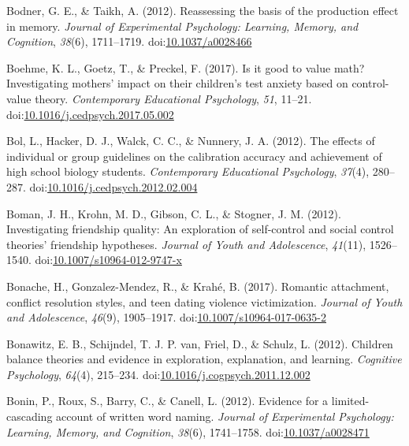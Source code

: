 \documentclass[english,man]{apa6}
\begin{document}
\hypertarget{ref-Bodner2012}{}
Bodner, G. E., \& Taikh, A. (2012). Reassessing the basis of the
production effect in memory. \emph{Journal of Experimental Psychology:
Learning, Memory, and Cognition}, \emph{38}(6), 1711--1719.
doi:\href{https://doi.org/10.1037/a0028466}{10.1037/a0028466}

\hypertarget{ref-Boehme2017}{}
Boehme, K. L., Goetz, T., \& Preckel, F. (2017). Is it good to value
math? Investigating mothers' impact on their children's test anxiety
based on control-value theory. \emph{Contemporary Educational
Psychology}, \emph{51}, 11--21.
doi:\href{https://doi.org/10.1016/j.cedpsych.2017.05.002}{10.1016/j.cedpsych.2017.05.002}

\hypertarget{ref-Bol2012}{}
Bol, L., Hacker, D. J., Walck, C. C., \& Nunnery, J. A. (2012). The
effects of individual or group guidelines on the calibration accuracy
and achievement of high school biology students. \emph{Contemporary
Educational Psychology}, \emph{37}(4), 280--287.
doi:\href{https://doi.org/10.1016/j.cedpsych.2012.02.004}{10.1016/j.cedpsych.2012.02.004}

\hypertarget{ref-BomanIV2012}{}
Boman, J. H., Krohn, M. D., Gibson, C. L., \& Stogner, J. M. (2012).
Investigating friendship quality: An exploration of self-control and
social control theories' friendship hypotheses. \emph{Journal of Youth
and Adolescence}, \emph{41}(11), 1526--1540.
doi:\href{https://doi.org/10.1007/s10964-012-9747-x}{10.1007/s10964-012-9747-x}

\hypertarget{ref-Bonache2017}{}
Bonache, H., Gonzalez-Mendez, R., \& Krahé, B. (2017). Romantic
attachment, conflict resolution styles, and teen dating violence
victimization. \emph{Journal of Youth and Adolescence}, \emph{46}(9),
1905--1917.
doi:\href{https://doi.org/10.1007/s10964-017-0635-2}{10.1007/s10964-017-0635-2}

\hypertarget{ref-Bonawitz2012}{}
Bonawitz, E. B., Schijndel, T. J. P. van, Friel, D., \& Schulz, L.
(2012). Children balance theories and evidence in exploration,
explanation, and learning. \emph{Cognitive Psychology}, \emph{64}(4),
215--234.
doi:\href{https://doi.org/10.1016/j.cogpsych.2011.12.002}{10.1016/j.cogpsych.2011.12.002}

\hypertarget{ref-Bonin2012}{}
Bonin, P., Roux, S., Barry, C., \& Canell, L. (2012). Evidence for a
limited-cascading account of written word naming. \emph{Journal of
Experimental Psychology: Learning, Memory, and Cognition}, \emph{38}(6),
1741--1758.
doi:\href{https://doi.org/10.1037/a0028471}{10.1037/a0028471}
\end{document}
